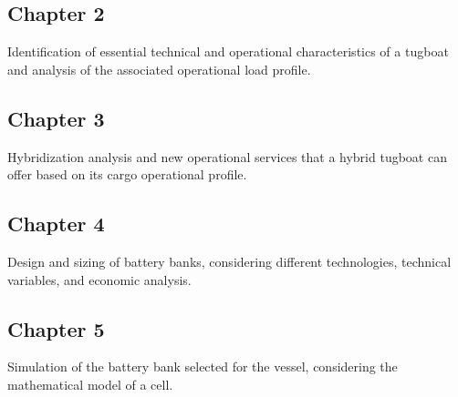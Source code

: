 \subsection*{Chapter 2}
Identification of essential technical and operational characteristics of a tugboat and analysis of the associated operational load profile.

\subsection*{Chapter 3}
Hybridization analysis and new operational services that a hybrid tugboat can offer based on its cargo operational profile.

\subsection*{Chapter 4}
Design and sizing of battery banks, considering different technologies, technical variables, and economic analysis.

\subsection*{Chapter 5}
Simulation of the battery bank selected for the vessel, considering the mathematical model of a cell.

